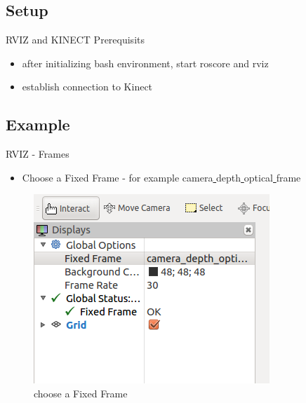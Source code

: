 \documentclass{beamer}
\begin{document}
\subsection{Setup}
\begin{frame}{RVIZ and KINECT Prerequisits}	

\begin{itemize}

	\item after initializing bash environment, start roscore and rviz
		 	
	
	
	\item establish connection to Kinect \\
		 
	
\end{itemize}
\end{frame}


\subsection{Example}
\begin{frame}{RVIZ - Frames}	

	\begin{itemize}
		\item Choose a Fixed Frame - for example camera\underline{ }depth\underline{ }optical\underline{ }frame
			
	\end{itemize}

	\begin{figure}[H]
		\centering
		\includegraphics[scale=0.5]{./images/RVIZ_Frame.png}
		\caption{choose a Fixed Frame}
		\label{fig:ros_add_frame}
	\end{figure}
\end{frame}
\end{document}
